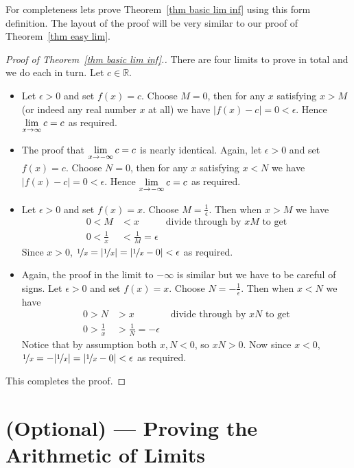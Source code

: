 For completeness lets prove Theorem~\ref{thm basic lim inf} using this form
definition. The layout of the proof will be very similar to our proof of
Theorem~\ref{thm easy lim}.
\begin{proof}[Proof of Theorem~\ref{thm basic lim inf}.]
There are four limits to prove in total and we do each in turn. Let $c \in
\mathbb{R}$.
\begin{itemize}
 \item Let $\epsilon>0$ and set $f(x)=c$. Choose $M=0$, then for any
$x$ satisfying $x>M$ (or indeed any real number $x$ at all) we have
$|f(x)-c| = 0 <\epsilon$. Hence $\displaystyle \lim_{x \to \infty} c = c$ as required.
\item The proof that $\displaystyle \lim_{x \to -\infty} c = c$ is nearly identical.
Again, let $\epsilon>0$ and set $f(x)=c$. Choose $N=0$, then for any
$x$ satisfying $x<N$ we have $|f(x)-c| = 0 <\epsilon$. Hence $\displaystyle \lim_{x \to
-\infty} c = c$ as required.
\item Let $\epsilon>0$ and set $f(x)=x$. Choose $M = \frac{1}{\epsilon}$. Then
when $x>M$ we have
\begin{align*}
  0 < M & < x  & \text{divide through by $xM$ to get}\\
  0 < \frac{1}{x} & < \frac{1}{M} = \epsilon
\end{align*}
Since $x>0$, $\nicefrac{1}{x} = |\nicefrac{1}{x}| = |\nicefrac{1}{x} - 0| <
\epsilon$ as required.

\item Again, the proof in the limit to $-\infty$ is similar but we have to be
careful of signs. Let $\epsilon>0$ and set $f(x)=x$. Choose $N
= -\frac{1}{\epsilon}$. Then when $x< N$ we have
\begin{align*}
  0 > N & > x  &\text{ divide through by $xN$ to get}\\
  0 > \frac{1}{x} &> \frac{1}{N} = -\epsilon
\end{align*}
Notice that by assumption both $x,N<0$, so $xN>0$. Now since $x<0$,
$\nicefrac{1}{x} = -|\nicefrac{1}{x}| = |\nicefrac{1}{x} - 0| < \epsilon$ as
required.
\end{itemize}
This completes the proof.

\end{proof}

\section{(Optional) --- Proving the Arithmetic of Limits}\label{sec proof arith lim}


